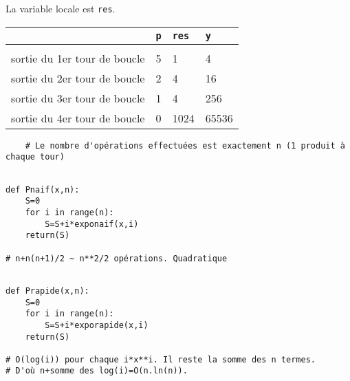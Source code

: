
	
	
La variable locale est \texttt{res}.
	
	
	\begin{center}
		\begin{tabular}{|l|p{1cm}|p{1cm}|p{1cm}|}
			\hline & \texttt{p} & \texttt{res} & \texttt{y}\\
			\hline &&&\\
			sortie du 1{\textrm{er}} tour de boucle & 5 & 1 & 4\\
sortie du 2{\textrm{er}} tour de boucle & 2 & 4 & 16\\
sortie du 3{\textrm{er}} tour de boucle & 1 & 4 & 256\\
sortie du 4{\textrm{er}} tour de boucle & 0 & 1024 & 65536\\
		\end{tabular}
		
	\end{center}
	
	\begin{lstlisting}
	# Le nombre d'opérations effectuées est exactement n (1 produit à chaque tour)
\end{lstlisting}
	


\begin{lstlisting}

def Pnaif(x,n):
    S=0
    for i in range(n):
        S=S+i*exponaif(x,i)
    return(S)

# n+n(n+1)/2 ~ n**2/2 opérations. Quadratique

\end{lstlisting}

	
\begin{lstlisting}

def Prapide(x,n):
    S=0
    for i in range(n):
        S=S+i*exporapide(x,i)
    return(S)

# O(log(i)) pour chaque i*x**i. Il reste la somme des n termes.
# D'où n+somme des log(i)=O(n.ln(n)).

\end{lstlisting}

